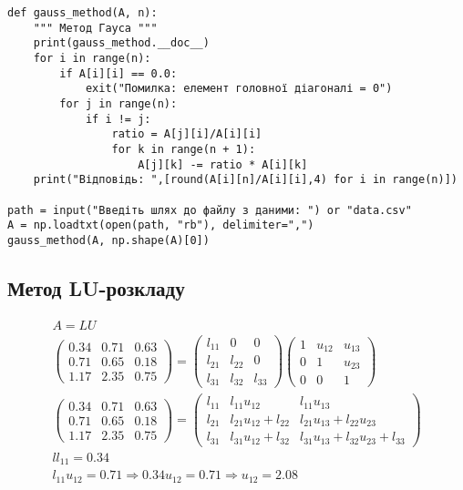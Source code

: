 \documentclass{article}
\begin{document}
\begin{large}
\begin{lstlisting}
def gauss_method(A, n):
	""" Метод Гауса """
	print(gauss_method.__doc__)
	for i in range(n):
		if A[i][i] == 0.0: 
			exit("Помилка: елемент головної діагоналі = 0")
		for j in range(n):
			if i != j:
				ratio = A[j][i]/A[i][i]
				for k in range(n + 1):
					A[j][k] -= ratio * A[i][k]
	print("Відповідь: ",[round(A[i][n]/A[i][i],4) for i in range(n)])

path = input("Введіть шлях до файлу з даними: ") or "data.csv"
A = np.loadtxt(open(path, "rb"), delimiter=",")
gauss_method(A, np.shape(A)[0])\end{lstlisting}
		
		\subsection*{Метод LU-розкладу}
		\begin{gather}\nonumber
		A=LU\\\nonumber
		\begin{pmatrix}
			0.34 & 0.71 & 0.63\\
			0.71 & 0.65 & 0.18\\
			1.17 & 2.35 & 0.75
		\end{pmatrix}
	=
		\begin{pmatrix}
			l_{11} & 0 & 0\\
			l_{21} & l_{22} & 0\\
			l_{31} & l_{32} & l_{33}
		\end{pmatrix}
		\begin{pmatrix}
			1 & u_{12} & u_{13}\\
			0 & 1 & u_{23}\\
			0 & 0 & 1
		\end{pmatrix}\\\nonumber
		\begin{pmatrix}
			0.34 & 0.71 & 0.63\\
			0.71 & 0.65 & 0.18\\
			1.17 & 2.35 & 0.75
		\end{pmatrix}
	=
		\begin{pmatrix}
			l_{11} & l_{11}u_{12} & l_{11}u_{13}\\
			l_{21} & l_{21}u_{12}+l_{22} & l_{21}u_{13}+l_{22}u_{23}\\
			l_{31} & l_{31}u_{12}+l_{32} & l_{31}u_{13}+l_{32}u_{23}+l_{33}
		\end{pmatrix}\\\nonumber
		ll_{11}=0.34\\\nonumber
		l_{11}u_{12}=0.71 \Rightarrow 0.34u_{12}=0.71 \Rightarrow u_{12}=2.08\\\nonumber

\end{gather}
\end{large}
\end{document}
